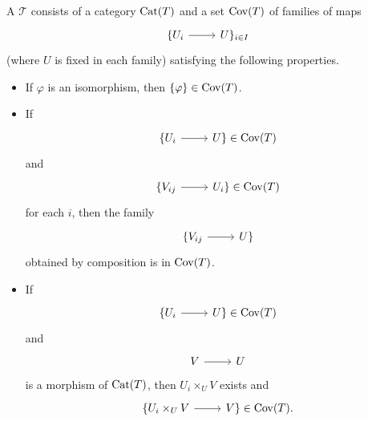 \documentclass [11 pt, oneside] {article}
\begin{document}
\begin{definition}\label{}\text{}
A  $\mathscr{T}$ consists of a category $\operatorname{Cat}(\relax{T})$ and a set $\operatorname{Cov}(\relax{T})$ of families of maps 
\[
\begin{tikzcd}
	\{U_{i}\ar[r]& U\}_{i\in I}
\end{tikzcd}
\]
(where $U$ is fixed in each family) satisfying the following properties.
 \begin{itemize}
	\item If $\varphi$ is an isomorphism, then $\{\varphi\}\in \operatorname{Cov}(\relax{T})$.
	\item If 
		\[
		\begin{tikzcd}
			\{U_{i}\ar[r]& U\}\in \Cov(\mathscr{T})
		\end{tikzcd}
		\]
		and
		\[
		\begin{tikzcd}
			\{V_{ij}\ar[r]& U_{i}\}\in \Cov(\mathscr{T})
		\end{tikzcd}
		\]
		for each $i$, then the family
		\[
		\begin{tikzcd}
			\{V_{ij} \ar[r]& U\}
		\end{tikzcd}
		\]
		obtained by composition is in $\operatorname{Cov}(\relax{T})$.
	\item If
		\[
		\begin{tikzcd}
			\{U_{i}\ar[r]& U\}\in \Cov(\mathscr{T})
		\end{tikzcd}
		\]
		and 
		\[
		\begin{tikzcd}
			V\ar[r]& U
		\end{tikzcd}
		\]
		is a morphism of $\operatorname{Cat}(\relax{T})$, then $U_{i}\times_{U}V$ exists and 
		\[
		\begin{tikzcd}
			\{U_{i}\times_{U}V\ar[r]& V\}\in \Cov(\mathscr{T}).
		\end{tikzcd}
		\]
\end{itemize}
\end{definition}
\end{document}
